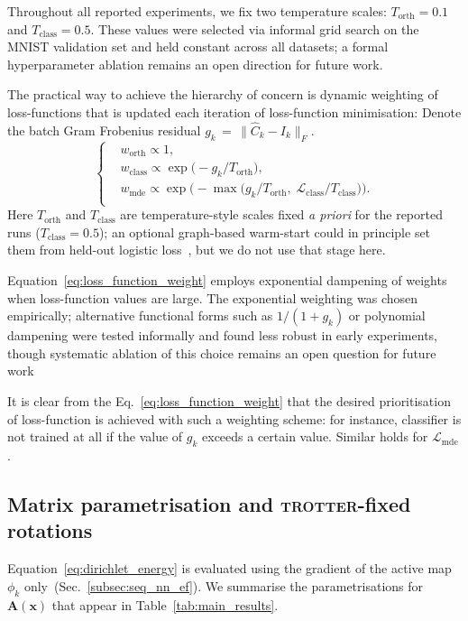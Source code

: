 \documentclass{article}
\theoremstyle{plain}
\theoremstyle{definition}
\theoremstyle{remark}
\newcommand{\new}[1]{#1}
\begin{document}
\new{Throughout all reported experiments, we fix two temperature scales: $T_{\mathrm{orth}}{=}0.1$ and $T_{\mathrm{class}}{=}0.5$.
These values were selected via informal grid search on the MNIST validation set and held constant across all datasets;
a formal hyperparameter ablation remains an open direction for future work.}

The practical way to achieve the hierarchy of concern is dynamic weighting of loss-functions that is updated
each iteration of loss-function minimisation:
Denote the batch Gram Frobenius residual $g_k \,{=}\,\|\hat C_k-I_k\|_F$.
\begin{equation}
    \label{eq:loss_function_weight}
        \begin{cases}
            & w_{\text{orth}} \propto 1, \\
            & w_{\text{class}} \propto \exp\big(- g_k / T_{\text{orth}}\big), \\
            & w_{\text{mde}} \propto \exp\big(- \max\big( g_k / T_{\text{orth}},\; \mathcal{L}_{\text{class}} / T_{\text{class}}\big) \big). \\
        \end{cases}
\end{equation}
Here $T_{\text{orth}}$ and $T_{\text{class}}$ are temperature-style scales fixed \emph{a priori} for the reported runs ($T_{\text{class}}{=}0.5$); an optional graph-based warm-start could in principle set them from held-out logistic loss~\cite{4476091}, but we do not use that stage here.

Equation~\eqref{eq:loss_function_weight} employs exponential dampening of weights when loss-function values are large.
The exponential weighting was chosen empirically; alternative functional forms such as $1/(1+g_k)$
or polynomial dampening were tested informally and found less robust in early experiments, though
systematic ablation of this choice remains an open question for future work

It is clear from the Eq.~\eqref{eq:loss_function_weight} that the desired prioritisation of loss-function is achieved
with such a weighting scheme: for instance, classifier is not trained at all if the value of $g_k$
exceeds a certain value. Similar holds for $\mathcal{L}_{\text{mde}}$.

\subsection{Matrix parametrisation and \textsc{trotter}-fixed rotations}
\label{subsec:matrix_parametrisation}
Equation~\eqref{eq:dirichlet_energy} is evaluated using the gradient of the active map $\phi_k$ only~(Sec.~\ref{subsec:seq_nn_ef}).
We summarise the parametrisations for $\mathbf{A}(\mathbf{x})$ that appear in Table~\ref{tab:main_results}.
\end{document}
